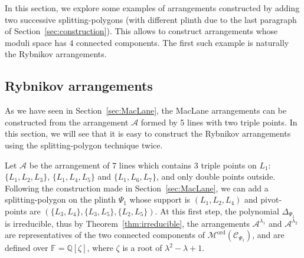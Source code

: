 \documentclass[11pt, a4paper]{amsart}
\theoremstyle{definition}
\theoremstyle{remark}
\newcommand{\QQ}{\mathds{Q}}
\newcommand{\FF}{\mathds{F}}
\newcommand{\A}{\mathcal{A}}
\newcommand{\C}{\mathcal{C}}
\newcommand{\M}{\mathcal{M}}
\newcommand{\ord}{\text{ord}}
\begin{document}
In this section, we explore some examples of arrangements constructed by adding two successive splitting-polygons (with different plinth due to the last paragraph of Section~\ref{sec:construction}). This allows to construct arrangements whose moduli space has 4 connected components. The first such example is naturally the Rybnikov arrangements.

\subsection{Rybnikov arrangements}\mbox{}

As we have seen in Section~\ref{sec:MacLane}, the MacLane arrangements can be constructed from the arrangement $\A$ formed by 5 lines with two triple points. In this section, we will see that it is easy to construct the Rybnikov arrangements~\cite{Ryb} using the splitting-polygon technique twice.

Let $\A$ be the arrangement of $7$ lines which contains $3$ triple points on $L_1$: $\{L_1,L_2,L_3\}$, $\{L_1,L_4,L_5\}$ and $\{L_1,L_6,L_7\}$, and only double points outside. Following the construction made in Section~\ref{sec:MacLane}, we can add a splitting-polygon on the plinth $\Psi_1$ whose support is $(L_1,L_2,L_4)$ and pivot-points are $(\{L_3,L_4\},\{L_3,L_5\},\{L_2,L_5\})$. At this first step, the polynomial $\Delta_{\Psi_1}$ is irreducible, thus by Theorem~\ref{thm:irreducible}, the arrangements $\A^{\lambda_1}$ and $\A^{\lambda_2}$ are representatives of the two connected components of $\M^\ord(\C_{\Psi_1})$, and are defined over $\FF=\QQ[\zeta]$, where $\zeta$ is a root of $\lambda^2-\lambda+1$. 
\end{document}
